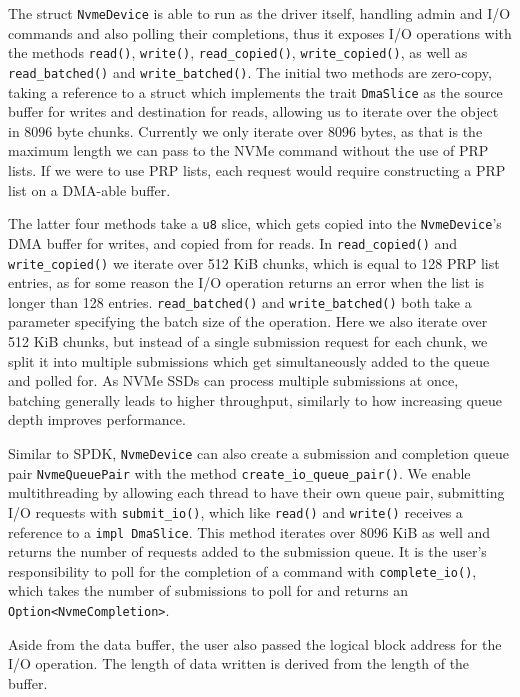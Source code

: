 The struct \texttt{NvmeDevice} is able to run as the driver itself, handling admin and I/O commands and also polling their completions, thus it exposes I/O operations with the methods \texttt{read()}, \texttt{write()},  \texttt{read\_copied()}, \texttt{write\_copied()}, as well as \texttt{read\_batched()} and \texttt{write\_batched()}. The initial two methods are zero-copy, taking a reference to a struct which implements the trait \texttt{DmaSlice} as the source buffer for writes and destination for reads, allowing us to iterate over the object in 8096 byte chunks. Currently we only iterate over 8096 bytes, as that is the maximum length we can pass to the NVMe command without the use of PRP lists. If we were to use PRP lists, each request would require constructing a PRP list on a DMA-able buffer.

The latter four methods take a \texttt{u8} slice, which gets copied into the \texttt{NvmeDevice}'s DMA buffer for writes, and copied from for reads. In \texttt{read\_copied()} and \texttt{write\_copied()} we iterate over 512 KiB chunks, which is equal to 128 PRP list entries, as for some reason the I/O operation returns an error when the list is longer than 128 entries. \texttt{read\_batched()} and \texttt{write\_batched()} both take a parameter specifying the batch size of the operation. Here we also iterate over 512 KiB chunks, but instead of a single submission request for each chunk, we split it into multiple submissions which get simultaneously added to the queue and polled for. As NVMe SSDs can process multiple submissions at once, batching generally leads to higher throughput, similarly to how increasing queue depth improves performance.

Similar to SPDK, \texttt{NvmeDevice} can also create a submission and completion queue pair \texttt{NvmeQueuePair} with the method \texttt{create\_io\_queue\_pair()}. We enable multithreading by allowing each thread to have their own queue pair, submitting I/O requests with \texttt{submit\_io()}, which like \texttt{read()} and \texttt{write()} receives a reference to a \texttt{impl DmaSlice}. This method iterates over 8096 KiB as well and returns the number of requests added to the submission queue. It is the user's responsibility to poll for the completion of a command with \texttt{complete\_io()}, which takes the number of submissions to poll for and returns an \texttt{Option<NvmeCompletion>}.

Aside from the data buffer, the user also passed the logical block address for the I/O operation. The length of data written is derived from the length of the buffer.
